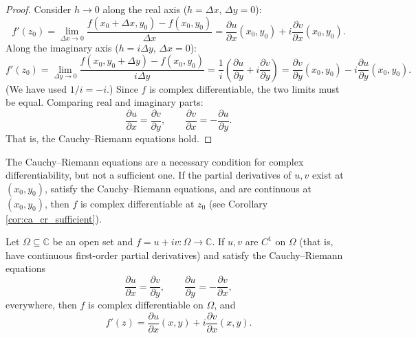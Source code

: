 \begin{proof}
Consider $h \to 0$ along the real axis ($h = \Delta x$, $\Delta y = 0$):
\[
f'(z_0) = \lim_{\Delta x \to 0} \frac{f(x_0 + \Delta x, y_0) - f(x_0, y_0)}{\Delta x} = \frac{\partial u}{\partial x}(x_0, y_0) + i \frac{\partial v}{\partial x}(x_0, y_0).
\]
Along the imaginary axis ($h = i \Delta y$, $\Delta x = 0$):
\[
f'(z_0) = \lim_{\Delta y \to 0} \frac{f(x_0, y_0 + \Delta y) - f(x_0, y_0)}{i \Delta y} = \frac{1}{i} \left( \frac{\partial u}{\partial y} + i \frac{\partial v}{\partial y} \right) = \frac{\partial v}{\partial y}(x_0, y_0) - i \frac{\partial u}{\partial y}(x_0, y_0).
\]
(We have used $1/i = -i$.) Since $f$ is complex differentiable, the two limits must be equal. Comparing real and imaginary parts:
\[
\frac{\partial u}{\partial x} = \frac{\partial v}{\partial y}, \qquad \frac{\partial v}{\partial x} = -\frac{\partial u}{\partial y}.
\]
That is, the Cauchy--Riemann equations hold.
\end{proof}

\begin{remark}\label{rem:ca_cr_sufficiency}
The Cauchy--Riemann equations are a necessary condition for complex differentiability, but not a sufficient one. If the partial derivatives of $u, v$ exist at $(x_0, y_0)$, satisfy the Cauchy--Riemann equations, and are continuous at $(x_0, y_0)$, then $f$ is complex differentiable at $z_0$ (see Corollary \ref{cor:ca_cr_sufficient}).
\end{remark}

\begin{theorem}\label{thm:ca_cr_sufficient}
Let $\Omega \subseteq \mathbb{C}$ be an open set and $f = u + iv: \Omega \to \mathbb{C}$. If $u, v$ are $C^1$ on $\Omega$ (that is, have continuous first-order partial derivatives) and satisfy the Cauchy--Riemann equations
\[
\frac{\partial u}{\partial x} = \frac{\partial v}{\partial y}, \qquad \frac{\partial u}{\partial y} = -\frac{\partial v}{\partial x},
\]
everywhere, then $f$ is complex differentiable on $\Omega$, and
\[
f'(z) = \frac{\partial u}{\partial x}(x, y) + i \frac{\partial v}{\partial x}(x, y).
\]
\end{theorem}

